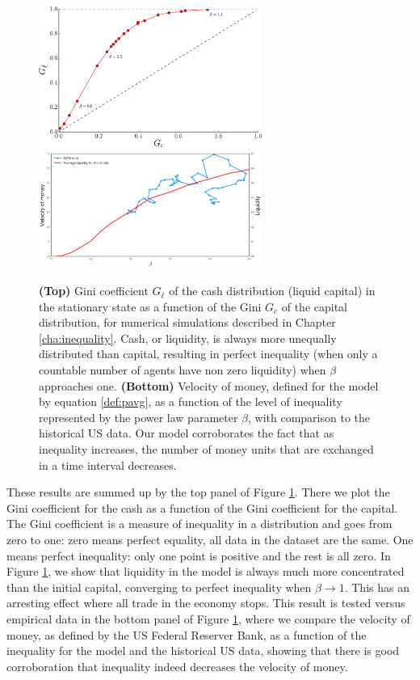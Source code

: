 \begin{figure}[!ht]
  \centering
  \includegraphics[width=0.65\textwidth]{figs_ineq/gini_intro.pdf}
  \includegraphics[width=0.65\textwidth]{figs_ineq/data_model.png}
  \caption{\textbf{(Top)} Gini coefficient $G_\ell$ of the cash distribution (liquid capital) in the stationary state as a function of the Gini $G_c$ of the capital distribution, for numerical simulations described in Chapter \ref{cha:inequality}. Cash, or liquidity, is always more unequally distributed than capital, resulting in perfect inequality (when only a countable number of agents have non zero liquidity) when $\beta$ approaches one. \textbf{(Bottom)} Velocity of money, defined for the model by equation \eqref{def:pavg}, as a function of the level of inequality represented by the power law parameter $\beta$, with comparison to the historical US data. Our model corroborates the fact that as inequality increases, the number of money units that are exchanged in a time interval decreases.}
  \label{fig:intro_ineq}
\end{figure}

These results are summed up by the top panel of Figure \ref{fig:intro_ineq}. There we plot the Gini coefficient for the cash as a function of the Gini coefficient for the capital. The Gini coefficient is a measure of inequality in a distribution and goes from zero to one: zero means perfect equality, all data in the dataset are the same. One means perfect inequality: only one point is positive and the rest is all zero. In Figure \ref{fig:intro_ineq}, we show that liquidity in the model is always much more concentrated than the initial capital, converging to perfect inequality when $\beta \to 1$. This has an arresting effect where all trade in the economy stops. This result is tested versus empirical data in the bottom panel of Figure \ref{fig:intro_ineq}, where we compare the velocity of money, as defined by the US Federal Reserver Bank, as a function of the inequality for the model and the historical US data, showing that there is good corroboration that inequality indeed decreases the velocity of money.



